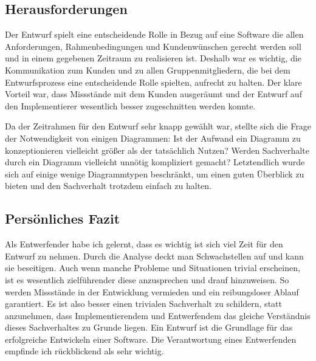 \subsection{Herausforderungen}
Der Entwurf spielt eine entscheidende Rolle in Bezug auf eine Software die allen  Anforderungen, Rahmenbedingungen und Kundenwünschen gerecht werden soll und in einem gegebenen Zeitraum zu realisieren ist. Deshalb war es wichtig, die Kommunikation zum Kunden und zu allen Gruppenmitgliedern, die bei dem Entwurfsprozess eine entscheidende Rolle spielten, aufrecht zu halten. Der klare Vorteil war, dass Missstände mit dem Kunden ausgeräumt und der Entwurf auf den Implementierer wesentlich besser zugeschnitten werden konnte.

Da der Zeitrahmen für den Entwurf sehr knapp gewählt war, stellte sich die Frage der Notwendigkeit von einigen Diagrammen: Ist der Aufwand ein Diagramm zu konzeptionieren vielleicht größer als der tatsächlich Nutzen? Werden Sachverhalte durch ein Diagramm vielleicht unnötig kompliziert gemacht? Letztendlich wurde sich auf einige wenige Diagrammtypen beschränkt, um einen guten Überblick zu bieten und den Sachverhalt trotzdem einfach zu halten.

\subsection{Persönliches Fazit}
Als Entwerfender habe ich gelernt, dass es wichtig ist sich viel Zeit für den Entwurf zu nehmen. Durch die Analyse deckt man Schwachstellen auf und kann sie beseitigen. Auch wenn manche Probleme und Situationen trivial erscheinen, ist es wesentlich zielführender diese anzusprechen und drauf hinzuweisen. So werden Missstände in der Entwicklung vermieden und ein reibungsloser Ablauf garantiert. Es ist also besser einen trivialen Sachverhalt zu schildern, statt anzunehmen, dass Implementierendem und Entwerfendem das gleiche Verständnis dieses Sachverhaltes zu Grunde liegen. Ein Entwurf ist die Grundlage für das erfolgreiche Entwickeln einer Software. Die Verantwortung eines Entwerfenden empfinde ich rückblickend als sehr wichtig. 